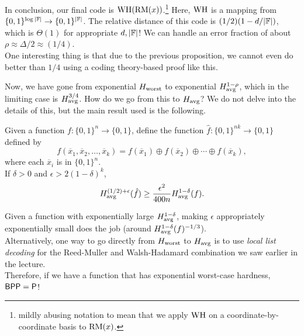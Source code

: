 		In conclusion, our final code is $\operatorname{WH}(\operatorname{RM}(x))$.\footnote{mildly abusing notation to mean that we apply $\operatorname{WH}$ on a coordinate-by-coordinate basis to $\operatorname{RM}(x)$.} Here, $\operatorname{WH}$ is a mapping from $\{0,1\}^{\log|\mathbb{F}|} \to \{0,1\}^{|\mathbb{F}|}$. The relative distance of this code is $(1/2)(1 - d/|\mathbb{F}|)$, which is $\Theta(1)$ for appropriate $d,|\mathbb{F}|$! We can handle an error fraction of about $\rho \approx \Delta/2 \approx (1/4)$.\\
		One interesting thing is that due to the previous proposition, we cannot even do better than $1/4$ using a coding theory-based proof like this.

		Now, we have gone from exponential $H_{\text{worst}}$ to exponential $H_{\text{avg}}^{1-\rho}$, which in the limiting case is $H_{\text{avg}}^{3/4}$. How do we go from this to $H_{\text{avg}}$? We do not delve into the details of this, but the main result used is the following.

		\begin{ftheo}
			Given a function $f : \{0,1\}^n \to \{0,1\}$, define the function $\hat{f} : \{0,1\}^{nk} \to \{0,1\}$ defined by
			\[ f(\overline{x}_1 , \overline{x}_2 , \ldots , \overline{x}_k) = f(\overline{x}_1) \oplus f(\overline{x}_2) \oplus \cdots \oplus f(\overline{x}_k), \]
			where each $\overline{x}_i$ is in $\{0,1\}^n$.\\
			If $\delta > 0$ and $\epsilon > 2(1-\delta)^k$,
			\[ H_{\text{avg}}^{(1/2) + \epsilon} (\hat{f}) \ge \frac{\epsilon^2}{400n} H_{\text{avg}}^{1-\delta}(f). \]
		\end{ftheo}
		Given a function with exponentially large $H_{\text{avg}}^{1-\delta}$, making $\epsilon$ appropriately exponentially small does the job (around $H_{\text{avg}}^{1-\delta}(f)^{-1/3}$).\\
		Alternatively, one way to go directly from $H_{\text{worst}}$ to $H_{\text{avg}}$ is to use \emph{local list decoding} for the Reed-Muller and Walsh-Hadamard combination we saw earlier in the lecture.\\

		Therefore, if we have a function that has exponential worst-case hardness, $\mathsf{BPP} = \mathsf{P}$!